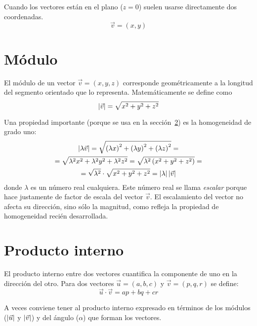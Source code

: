 \documentclass[a5paper,12pt,twoside]{book}
\begin{document}
Cuando los vectores están en el plano ($z = 0$) suelen usarse directamente dos coordenadas.
\[ \vec{v} = (x, y) \]


\section{Módulo}
El módulo de un vector $\Vec{v} = (x, y, z)$ corresponde geométricamente a la longitud del segmento orientado que lo representa.
Matemáticamente se define como
\[ {\left| {\vec{v}} \right|} = \sqrt{x^2 + y^2 + z^2} \]

Una propiedad importante (porque se usa en la sección~\ref{sec:innerProduct}) es la homogeneidad de grado uno:
\begin{multline*}
    {\left| {\lambda \vec{v}} \right|} = \sqrt{\left(\lambda x\right)^2 + \left(\lambda y\right)^2 + \left(\lambda z\right)^2} =
    \\
    = \sqrt{\lambda^2 x^2 + \lambda^2 y^2 + \lambda^2 z^2} = \sqrt{\lambda^2 \left( x^2 + y^2 + z^2 \right)} =
    \\
    = \sqrt{\lambda^2} \cdot \sqrt{x^2 + y^2 + z^2} = \left| \lambda \right| {\left| {\vec{v}} \right|}
\end{multline*}
donde $\lambda$ es un número real cualquiera.
Este número real se llama \emph{escalar} porque hace justamente de factor de escala del vector $\vec{v}$.
El escalamiento del vector no afecta su dirección, sino sólo la magnitud, como refleja la propiedad de homogeneidad recién desarrollada.


\section{Producto interno}
\label{sec:innerProduct}
El producto interno entre dos vectores cuantifica la componente de uno en la dirección del otro.
Para dos vectores $\vec{u}=(a,b,c)$ y $\vec{v}=(p,q,r)$ se define:
\[ \vec{u} \cdot \vec{v} = ap + bq + cr \]

A veces conviene tener al producto interno expresado en términos de los módulos (${\left| {\vec{u}} \right|}$ y ${\left| {\vec{v}} \right|}$) y del ángulo ($\alpha$) que forman los vectores.

\end{document}
